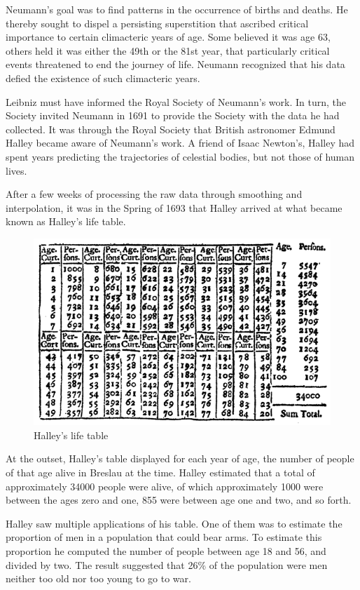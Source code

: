 \documentclass{tufte-book}
\begin{document}
Neumann's goal was to find patterns in the occurrence of births and
deaths. He thereby sought to dispel a persisting superstition that
ascribed critical importance to certain climacteric years of age. Some
believed it was age 63, others held it was either the 49th or the 81st
year, that particularly critical events threatened to end the journey of
life. Neumann recognized that his data defied the existence of such
climacteric years.

Leibniz must have informed the Royal Society of Neumann's work. In turn,
the Society invited Neumann in 1691 to provide the Society with the data
he had collected. It was through the Royal Society that British
astronomer Edmund Halley became aware of Neumann's work. A friend of
Isaac Newton's, Halley had spent years predicting the trajectories of
celestial bodies, but not those of human lives.

After a few weeks of processing the raw data through smoothing and
interpolation, it was in the Spring of 1693 that Halley arrived at what
became known as Halley's life table.

\begin{figure}
\centering
\includegraphics{assets/halley_life_table_1693.png}
\caption{Halley's life table}
\end{figure}

At the outset, Halley's table displayed for each year of age, the number
of people of that age alive in Breslau at the time. Halley estimated
that a total of approximately 34000 people were alive, of which
approximately 1000 were between the ages zero and one, 855 were between
age one and two, and so forth.

Halley saw multiple applications of his table. One of them was to
estimate the proportion of men in a population that could bear arms. To
estimate this proportion he computed the number of people between age 18
and 56, and divided by two. The result suggested that 26\% of the
population were men neither too old nor too young to go to war.
\end{document}
